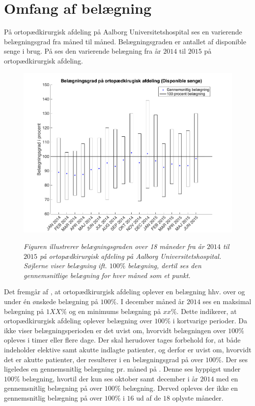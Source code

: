 \section{Omfang af belægning}
På ortopædkirurgisk afdeling på Aalborg Universitetshospital ses en varierende belægningsgrad fra måned til måned. Belægningsgraden er antallet af disponible senge i brug. På  ses den varierende belægning fra år $2014$ til $2015$ på ortopædkirurgisk afdeling. \cite{SDS2015}


\begin{figure}[H]
	\flushleft 
	\centering
	\includegraphics[scale=.45]{figures/maxminoverbelaeg.png}
	\label{maxminbelaeg}
	\flushleft
	\caption{\textit{Figuren illustrerer belægningsgraden over 18 måneder fra år $2014$ til $2015$ på ortopædkirurgisk afdeling på Aalborg Universitetshospital. Søjlerne viser belægning ift. $100\%$ belægning, dertil ses den gennemsnitlige belægning for hver måned som et punkt. \cite{SDS2015}}}
\end{figure}

\noindent
Det fremgår af , at ortopædkirurgisk afdeling oplever en belægning hhv. over og under én ønskede belægning på $100 \%$. I december måned år $2014$ ses en maksimal belægning på $1XX \%$ og en minimums belægning på $xx \%$. Dette indikerer, at ortopædkirurgisk afdeling oplever belægning over $100 \%$ i kortvarige perioder. Da  ikke viser belægningsperioden er det uvist om, hvorvidt belægningen over $100 \%$ opleves i timer eller flere dage. Der skal herudover tages forbehold for, at  både indeholder elektive samt akutte indlagte patienter, og derfor er uvist om, hvorvidt det er akutte patienter, der resulterer i en belægningsgrad på over $100 \%$. Der ses ligeledes en gennemsnitlig belægning pr. måned på . Denne ses hyppigst under $100 \%$ belægning, hvortil der kun ses oktober samt december i år $2014$ med en gennemsnitlig belægning på over $100 \%$ belægning. Derved opleves der ikke en gennemsnitlig belægning på over $100 \%$ i $16$ ud af de $18$ oplyste måneder. \cite{SDS2015}


